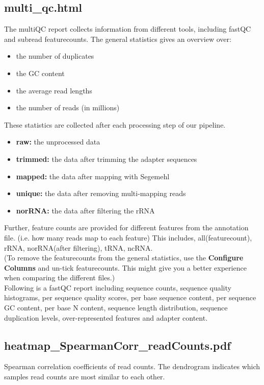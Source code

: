 \documentclass[10pt,a4paper]{article}
\begin{document}
\subsection*{multi\_qc.html}
The multiQC report collects information from different tools, including fastQC and subread featurecounts.
The general statistics gives an overview over:
\begin{itemize}
\item the number of duplicates
\item the GC content
\item the average read lengths
\item the number of reads (in millions)
\end{itemize}
These statistics are collected after each processing step of our pipeline. 
\begin{itemize}
\item \textbf{raw:} the unprocessed data
\item \textbf{trimmed:} the data after trimming the adapter sequences
\item \textbf{mapped:} the data after mapping with Segemehl
\item \textbf{unique:} the data after removing multi-mapping reads
\item \textbf{norRNA:} the data after filtering the rRNA
\end{itemize}

\noindent Further, feature counts are provided for different features from the annotation file. (i.e. how many reads map to each feature)
This includes, all(featurecount), rRNA, norRNA(after filtering), tRNA, ncRNA. \\

\noindent (To remove the featurecounts from the general statistics, use the \textbf{Configure Columns} and un-tick featurecounts. This might give you a better experience when comparing the different files.)\\

\noindent Following is a fastQC report including sequence counts, sequence quality histograms, per sequence quality scores, per base sequence content, per sequence GC content, per base N content, sequence length distribution, sequence duplication levels, over-represented features and adapter content.

\subsection*{heatmap\_SpearmanCorr\_readCounts.pdf}
Spearman correlation coefficients of read counts. The dendrogram indicates which samples read counts are most similar to each other.
\end{document}
